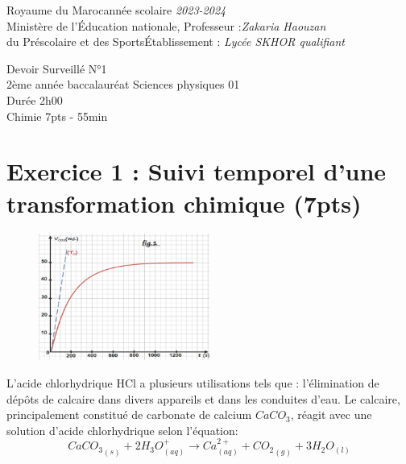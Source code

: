 \documentclass[12pt]{article}
\newcommand\headerMe[2]{\noindent{}#1\hfill#2}
\begin{document}
\headerMe{Royaume du Maroc}{année scolaire \emph{2023-2024}}\\
\headerMe{Ministère de l'Éducation nationale, }{  Professeur :\emph{Zakaria Haouzan}}\\
\headerMe{du Préscolaire et des Sports}{Établissement : \emph{Lycée SKHOR qualifiant}}\\
\vspace{-1cm}
\begin{center}
Devoir Surveillé  N°1 \\
    2ème année baccalauréat Sciences physiques 01\\
Durée 2h00
\\
    \vspace{.2cm}
\hrulefill
\Large{Chimie 7pts - 55min}
\hrulefill\\

\end{center}
\vspace{-1.1cm}
 \section*{Exercice 1 : Suivi temporel d’une transformation chimique \dotfill(7pts) }
 \begin{figure}

\begin{center}
	\vspace{-1,2cm}
  \includegraphics[width=0.50\textwidth ]{./img/fig00.png}
\end{center}
\end{figure}

L’acide chlorhydrique HCl a plusieurs utilisations tels que : l’élimination de 
dépôts de calcaire dans divers appareils et dans les conduites d’eau. Le calcaire, 
principalement constitué de carbonate de calcium $CaCO_3$, réagit avec une 
solution d’acide chlorhydrique selon l’équation:
$${CaCO_3}_{(s)} + 2H_3O^+_{(aq)} \rightarrow Ca^{2+}_{(aq)} + {CO_2}_{(g)} + 3H_2O_{(l)}$$
\end{document}
